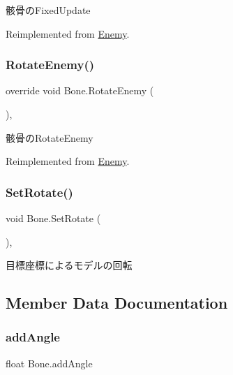 骸骨の\+Fixed\+Update 



Reimplemented from \hyperlink{class_enemy_ab19a73003a5b443ba93f4b6a45c0abad}{Enemy}.

\mbox{\label{class_bone_adc5939e68918d95e811cce5bfb87f7e5}} 
\subsubsection{\texorpdfstring{Rotate\+Enemy()}{RotateEnemy()}}
{\footnotesize\ttfamily override void Bone.\+Rotate\+Enemy (\begin{DoxyParamCaption}{ }\end{DoxyParamCaption})\hspace{0.3cm}{\ttfamily [inline]}, {\ttfamily [virtual]}}



骸骨の\+Rotate\+Enemy 



Reimplemented from \hyperlink{class_enemy_a2a0e665070fd362bd3ab2f2962ebff93}{Enemy}.

\mbox{\label{class_bone_a2741ce8e7ff43d5e84eb8c9be535e444}} 
\subsubsection{\texorpdfstring{Set\+Rotate()}{SetRotate()}}
{\footnotesize\ttfamily void Bone.\+Set\+Rotate (\begin{DoxyParamCaption}{ }\end{DoxyParamCaption})\hspace{0.3cm}{\ttfamily [inline]}, {\ttfamily [private]}}



目標座標によるモデルの回転 



\subsection{Member Data Documentation}
\mbox{\label{class_bone_ae1b6787fe1fb6d6ffc39ac64c7ef4910}} 
\subsubsection{\texorpdfstring{add\+Angle}{addAngle}}
{\footnotesize\ttfamily float Bone.\+add\+Angle\hspace{0.3cm}{\ttfamily [private]}}



